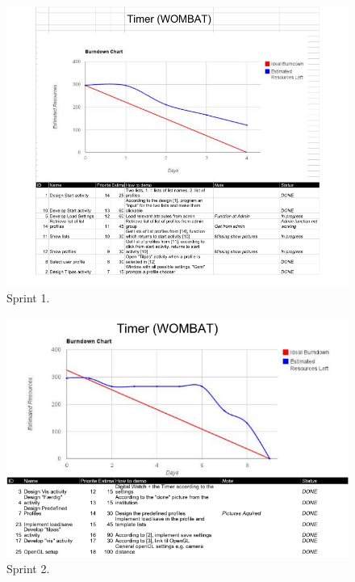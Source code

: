 	\begin{figure}[H]
		\centering
			\includegraphics[width=\textwidth]{Development/burndown_charts/Sprint_1.png}
				\caption{Sprint 1.}
		\label{fig:sprint1}
	\end{figure}
	
	\begin{figure}[H]
		\centering
			\includegraphics[width=\textwidth]{Development/burndown_charts/Sprint_2.png}
				\caption{Sprint 2.}
		\label{fig:sprint2}
	\end{figure}
	

